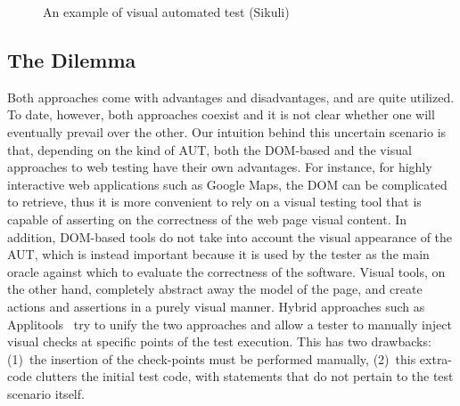 \begin{figure}[b]
\centering
{}
\caption{An example of visual automated test (Sikuli)}
\label{fig:visual}
\end{figure}

\subsection{The Dilemma}
Both approaches come with advantages and disadvantages, and are quite utilized. %
To date, however, both approaches coexist and it is not clear whether one will eventually prevail over the other. Our intuition behind this uncertain scenario is that, depending on the kind of AUT, both the DOM-based and the visual approaches to web testing have their own advantages. For instance, for highly interactive web applications such as Google Maps, the DOM can be complicated to retrieve, thus it is more convenient to rely on a visual testing tool that is capable of asserting on the correctness of the web page visual content.
In addition, DOM-based tools do not take into account the visual appearance of the AUT, which is instead important because it is used by the tester as the main oracle against which to evaluate the correctness of the software. Visual tools, on the other hand, completely abstract away the model of the page, and create actions and assertions in a purely visual manner. 
%
Hybrid approaches such as Applitools~\cite{applitools} try to unify the two approaches and allow a tester to manually inject visual checks at specific points of the test execution. This has two drawbacks: (1)~the insertion of the check-points must be performed manually, (2)~this extra-code clutters the initial test code, with statements that do not pertain to the test scenario itself.


